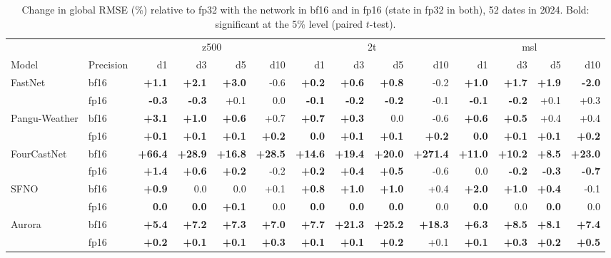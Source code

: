 \begin{table}[htbp]
\centering
\scriptsize
\setlength{\tabcolsep}{3pt}
\caption{Change in global RMSE (\%) relative to fp32 with the network in bf16 and in fp16 (state in fp32 in both), 52 dates in 2024. Bold: significant at the 5\% level (paired $t$-test).}
\label{tab:bf16}
\begin{tabular}{llrrrrrrrrrrrr}
\toprule
 & & \multicolumn{4}{c}{z500} & \multicolumn{4}{c}{2t} & \multicolumn{4}{c}{msl} \\
Model & Precision & d1 & d3 & d5 & d10 & d1 & d3 & d5 & d10 & d1 & d3 & d5 & d10 \\
\midrule
FastNet & bf16 & \textbf{+1.1} & \textbf{+2.1} & \textbf{+3.0} & -0.6 & \textbf{+0.2} & \textbf{+0.6} & \textbf{+0.8} & -0.2 & \textbf{+1.0} & \textbf{+1.7} & \textbf{+1.9} & \textbf{-2.0} \\
 & fp16 & \textbf{-0.3} & \textbf{-0.3} & +0.1 & 0.0 & \textbf{-0.1} & \textbf{-0.2} & \textbf{-0.2} & -0.1 & \textbf{-0.1} & \textbf{-0.2} & +0.1 & +0.3 \\
\midrule
Pangu-Weather & bf16 & \textbf{+3.1} & \textbf{+1.0} & \textbf{+0.6} & +0.7 & \textbf{+0.7} & \textbf{+0.3} & 0.0 & -0.6 & \textbf{+0.6} & \textbf{+0.5} & +0.4 & +0.4 \\
 & fp16 & \textbf{+0.1} & \textbf{+0.1} & \textbf{+0.1} & \textbf{+0.2} & \textbf{0.0} & \textbf{+0.1} & \textbf{+0.1} & \textbf{+0.2} & \textbf{0.0} & \textbf{+0.1} & \textbf{+0.1} & \textbf{+0.2} \\
\midrule
FourCastNet & bf16 & \textbf{+66.4} & \textbf{+28.9} & \textbf{+16.8} & \textbf{+28.5} & \textbf{+14.6} & \textbf{+19.4} & \textbf{+20.0} & \textbf{+271.4} & \textbf{+11.0} & \textbf{+10.2} & \textbf{+8.5} & \textbf{+23.0} \\
 & fp16 & \textbf{+1.4} & \textbf{+0.6} & \textbf{+0.2} & -0.2 & \textbf{+0.2} & \textbf{+0.4} & \textbf{+0.5} & -0.6 & 0.0 & \textbf{-0.2} & \textbf{-0.3} & \textbf{-0.7} \\
\midrule
SFNO & bf16 & \textbf{+0.9} & 0.0 & 0.0 & +0.1 & \textbf{+0.8} & \textbf{+1.0} & \textbf{+1.0} & +0.4 & \textbf{+2.0} & \textbf{+1.0} & \textbf{+0.4} & -0.1 \\
 & fp16 & \textbf{0.0} & \textbf{0.0} & \textbf{+0.1} & 0.0 & \textbf{0.0} & \textbf{0.0} & \textbf{0.0} & 0.0 & \textbf{0.0} & 0.0 & \textbf{0.0} & 0.0 \\
\midrule
Aurora & bf16 & \textbf{+5.4} & \textbf{+7.2} & \textbf{+7.3} & \textbf{+7.0} & \textbf{+7.7} & \textbf{+21.3} & \textbf{+25.2} & \textbf{+18.3} & \textbf{+6.3} & \textbf{+8.5} & \textbf{+8.1} & \textbf{+7.4} \\
 & fp16 & \textbf{+0.2} & \textbf{+0.1} & \textbf{+0.1} & \textbf{+0.3} & \textbf{+0.1} & \textbf{+0.1} & \textbf{+0.2} & +0.1 & \textbf{+0.1} & \textbf{+0.3} & \textbf{+0.2} & \textbf{+0.5} \\
\bottomrule
\end{tabular}
\end{table}
